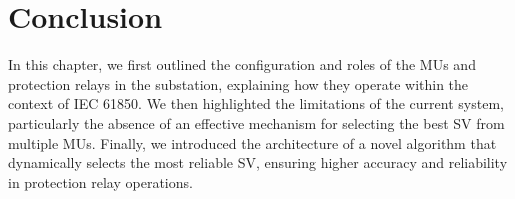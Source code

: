 \section{Conclusion}

In this chapter, we first outlined the configuration and roles of the MUs and protection relays in the substation, explaining how they operate within the context of IEC 61850. We then highlighted the limitations of the current system, particularly the absence of an effective mechanism for selecting the best SV from multiple MUs. Finally, we introduced the architecture of a novel algorithm that dynamically selects the most reliable SV, ensuring higher accuracy and reliability in protection relay operations.






